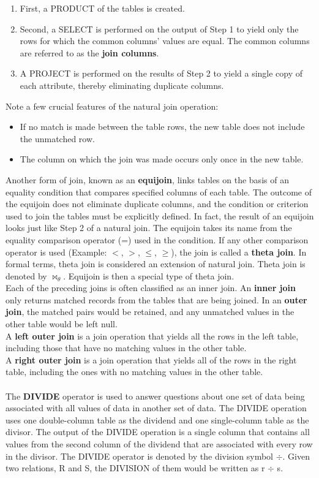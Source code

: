 \documentclass[a4paper, 12pt, titlepage]{report}
\begin{document}
{\begin{enumerate}
\item First, a PRODUCT of the tables is created.
\item Second, a SELECT is performed on the output of Step 1 to yield only the rows for
which the common columns’ values are equal. The common columns are referred to as the \textbf{join columns}.
\item A PROJECT is performed on the results of Step 2 to yield a single copy of each attribute, thereby eliminating duplicate columns.
\end{enumerate}
Note a few crucial features of the natural join operation:
\begin{itemize}
\item If no match is made between the table rows, the new table does not include the unmatched row.
\item The column on which the join was made occurs only once in the new table.
\end{itemize}
Another form of join, known as an \textbf{equijoin}, links tables on the basis of an equality condition that compares specified columns of each table. The outcome of the equijoin does not eliminate duplicate columns, and the condition or criterion used to join the tables must be explicitly defined. In fact, the result of an equijoin looks just like Step 2 of a natural join. The equijoin takes its name from the equality comparison operator (=) used in the condition. If any other comparison operator is used (Example: $<$, $>$, $\leq$, $\geq$), the join is called a \textbf{theta join}. In formal terms, theta join is considered an extension of natural join. Theta join is denoted by $\bowtie_{\theta}$. Equijoin is then a special type of theta join.\\
Each of the preceding joins is often classified as an inner join. An \textbf{inner join} only returns matched records from the tables that are being joined. In an \textbf{outer join}, the matched pairs would be retained, and any unmatched values in the other table would be left null.\\
A \textbf{left outer join} is a join operation that yields all the rows in the left table, including those that have no matching values in the other table.\\
A \textbf{right outer join} is a join operation that yields all of the rows in the right table, including the ones with no matching values in the other table.\\ \\
The \textbf{DIVIDE} operator is used to answer questions about one set of data being associated with all values of data in another set of data. The DIVIDE operation uses one
double-column table as the dividend and one single-column table as the divisor. The output of the DIVIDE operation is a single column that contains all values from the second column of the dividend that are associated with every row in the divisor. The DIVIDE operator is denoted by the division symbol $\div$. Given two relations, R and S, the DIVISION of them would be written as r $\div$ s.
}
\end{document}
